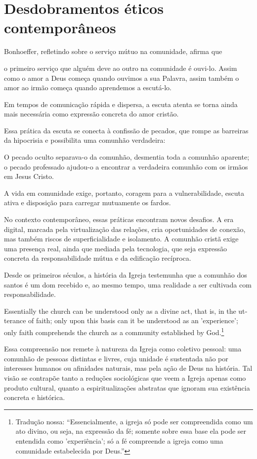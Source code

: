 \section{Desdobramentos éticos contemporâneos}

Bonhoeffer, refletindo sobre o serviço mútuo na comunidade, afirma que
\begin{citacao}
o primeiro serviço que alguém deve ao outro na comunidade é ouvi-lo. Assim como o amor a Deus começa quando ouvimos a sua Palavra, assim também o amor ao irmão começa quando aprendemos a escutá-lo. \cite[pp.~75--76]{bonhoeffer1997}
\end{citacao}
Em tempos de comunicação rápida e dispersa, a escuta atenta se torna ainda mais necessária como expressão concreta do amor cristão.

Essa prática da escuta se conecta à confissão de pecados, que rompe as barreiras da hipocrisia e possibilita uma comunhão verdadeira:
\begin{citacao}
O pecado oculto separava-o da comunhão, desmentia toda a comunhão aparente; o pecado professado ajudou-o a encontrar a verdadeira comunhão com os irmãos em Jesus Cristo. \cite[p.~88]{bonhoeffer1997}
\end{citacao}

A vida em comunidade exige, portanto, coragem para a vulnerabilidade, escuta ativa e disposição para carregar mutuamente os fardos.

No contexto contemporâneo, essas práticas encontram novos desafios. A era digital, marcada pela virtualização das relações, cria oportunidades de conexão, mas também riscos de superficialidade e isolamento. A comunhão cristã exige uma presença real, ainda que mediada pela tecnologia, que seja expressão concreta da responsabilidade mútua e da edificação recíproca.

Desde os primeiros séculos, a história da Igreja testemunha que a comunhão dos santos é um dom recebido e, ao mesmo tempo, uma realidade a ser cultivada com responsabilidade.

\begin{citacao}
\foreignlanguage{english}{Essentially the church can be understood only as a divine act, that is, in the utterance of faith; only upon this basis can it be understood as an 'experience'; only faith comprehends the church as a community established by God.}\footnote{Tradução nossa: ``Essencialmente, a igreja só pode ser compreendida como um ato divino, ou seja, na expressão da fé; somente sobre essa base ela pode ser entendida como 'experiência'; só a fé compreende a igreja como uma comunidade estabelecida por Deus.''} \cite[p.~195]{bonhoeffer1963}
\end{citacao}

Essa compreensão nos remete à natureza da Igreja como coletivo pessoal: uma comunhão de pessoas distintas e livres, cuja unidade é sustentada não por interesses humanos ou afinidades naturais, mas pela ação de Deus na história. Tal visão se contrapõe tanto a reduções sociológicas que veem a Igreja apenas como produto cultural, quanto a espiritualizações abstratas que ignoram sua existência concreta e histórica.
